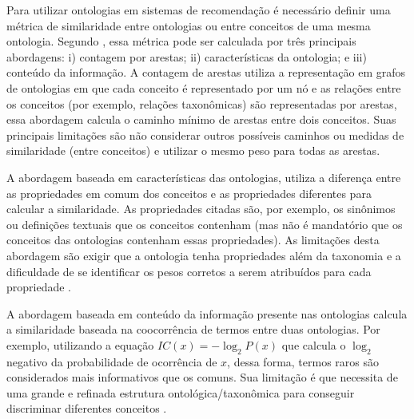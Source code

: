 Para utilizar ontologias em sistemas de recomendação é necessário definir uma métrica de similaridade entre ontologias ou entre conceitos de uma mesma ontologia. Segundo , essa métrica pode ser calculada por três principais abordagens: i) contagem por arestas; ii) características da ontologia; e iii) conteúdo da informação. A contagem de arestas utiliza a representação em grafos de ontologias em que cada conceito é representado por um nó e as relações entre os conceitos (por exemplo, relações taxonômicas) são representadas por arestas, essa abordagem calcula o caminho mínimo de arestas entre dois conceitos. Suas principais limitações são não considerar outros possíveis caminhos ou medidas de similaridade (entre conceitos) e utilizar o mesmo peso para todas as arestas.

A abordagem baseada em características das ontologias, utiliza a diferença entre as propriedades em comum dos conceitos e as propriedades diferentes para calcular a similaridade. As propriedades citadas são, por exemplo, os sinônimos ou definições textuais que os conceitos contenham (mas não é mandatório que os conceitos das ontologias contenham essas propriedades). As limitações desta abordagem são exigir que a ontologia tenha propriedades além da taxonomia e a dificuldade de se identificar os pesos corretos a serem atribuídos para cada propriedade \cite{Sanchez2012}.

A abordagem baseada em conteúdo da informação presente nas ontologias calcula a similaridade baseada na coocorrência de termos entre duas ontologias. Por exemplo, utilizando a equação \(IC(x) = -\log_2 P(x)\) que calcula o \(\log_2\) negativo da probabilidade de ocorrência de \(x\), dessa forma, termos raros são considerados mais informativos que os comuns. Sua limitação é que necessita de uma grande e refinada estrutura ontológica/taxonômica para conseguir discriminar diferentes conceitos .

